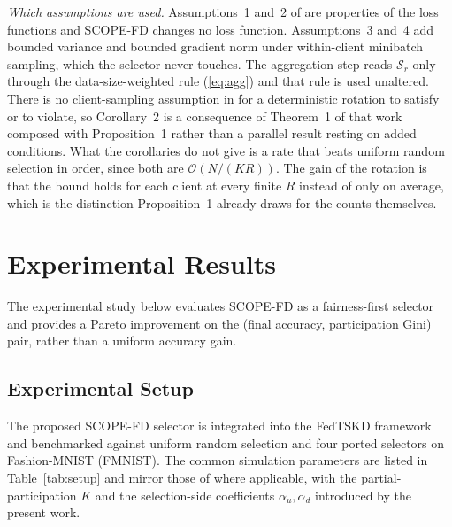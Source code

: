 \documentclass[journal]{IEEEtran}
\newcommand{\rev}[1]{#1}
\begin{document}
\rev{\textit{Which assumptions are used.} Assumptions~1 and~2 of \cite{mu2024fedtskd} are properties of the loss functions and SCOPE-FD changes no loss function. Assumptions~3 and~4 add bounded variance and bounded gradient norm under within-client minibatch sampling, which the selector never touches. The aggregation step reads $\mathcal{S}_r$ only through the data-size-weighted rule (\ref{eq:agg}) and that rule is used unaltered. There is no client-sampling assumption in \cite{mu2024fedtskd} for a deterministic rotation to satisfy or to violate, so Corollary~2 is a consequence of Theorem~1 of that work composed with Proposition~1 rather than a parallel result resting on added conditions. What the corollaries do not give is a rate that beats uniform random selection in order, since both are $\mathcal{O}(N/(KR))$. The gain of the rotation is that the bound holds for each client at every finite $R$ instead of only on average, which is the distinction Proposition~1 already draws for the counts themselves.}

\section{Experimental Results}
\label{sec:experiments}

The experimental study below evaluates SCOPE-FD as a fairness-first selector and provides a Pareto improvement on the (final accuracy, participation Gini) pair, rather than a uniform accuracy gain.

\subsection{Experimental Setup}
\label{ssec:exp-setup}

The proposed SCOPE-FD selector is integrated into the FedTSKD framework \cite{mu2024fedtskd} and benchmarked against uniform random selection and four ported selectors on Fashion-MNIST (FMNIST). The common simulation parameters are listed in Table~\ref{tab:setup} and mirror those of \cite{mu2024fedtskd} where applicable, with the partial-participation $K$ and the selection-side coefficients $\alpha_u, \alpha_d$ introduced by the present work.
\end{document}
